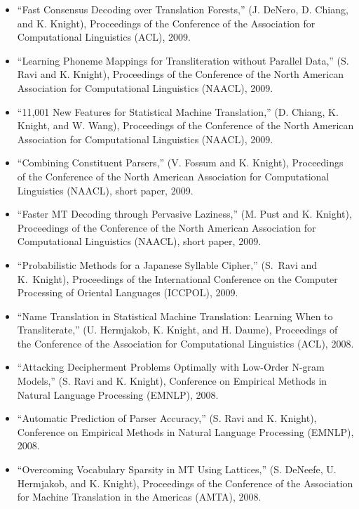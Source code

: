 \begin{itemize}
\item ``Fast Consensus Decoding over Translation Forests,''
(J. DeNero, D. Chiang, and K. Knight), 
Proceedings of the Conference of the 
Association for Computational Linguistics (ACL), 
2009.

\item ``Learning Phoneme Mappings for Transliteration without Parallel Data,''
(S. Ravi and K. Knight), 
Proceedings of the Conference of the 
North American Association for Computational Linguistics (NAACL), 
2009.

\item ``11,001 New Features for Statistical Machine Translation,''
(D. Chiang, K. Knight, and W. Wang), 
Proceedings of the Conference of the 
North American Association for Computational Linguistics (NAACL), 
2009.

\item ``Combining Constituent Parsers,''
(V. Fossum and K. Knight), 
Proceedings of the Conference of the 
North American Association for Computational Linguistics (NAACL), 
short paper,
2009.

\item ``Faster MT Decoding through Pervasive Laziness,''
(M. Pust and K. Knight), 
Proceedings of the Conference of the 
North American Association for Computational Linguistics (NAACL), 
short paper,
2009.

\item ``Probabilistic Methods for a Japanese Syllable Cipher,''
(S.~Ravi and K.~Knight), Proceedings of the International 
Conference on the Computer
Processing of Oriental Languages (ICCPOL), 2009.

\item ``Name Translation in Statistical Machine Translation: Learning 
When to Transliterate,'' (U. Hermjakob, K. Knight, and H. Daume), 
Proceedings of the Conference of the 
Association for Computational Linguistics (ACL), 
2008.

\item ``Attacking Decipherment Problems Optimally with Low-Order 
N-gram Models,'' (S. Ravi and K. Knight), 
Conference on Empirical Methods in Natural Language Processing (EMNLP), 
2008. 

\item ``Automatic Prediction of Parser Accuracy,'' (S. Ravi and K. Knight), 
Conference on Empirical Methods in Natural Language Processing (EMNLP), 
2008. 

\item ``Overcoming Vocabulary Sparsity in MT Using Lattices,'' 
(S. DeNeefe, U. Hermjakob, and K. Knight), 
Proceedings of the Conference of the Association for Machine
Translation in the Americas (AMTA), 
2008. 


\end{itemize}
